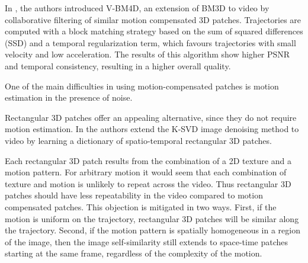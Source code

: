 \documentclass[10pt, journal, twocolumn, final, a4paper]{IEEEtran}
\begin{document}
In \cite{Maggioni2011,Maggioni2012}, the authors introduced V-BM4D, an
extension of BM3D to video by collaborative filtering of similar motion
compensated 3D patches. Trajectories are computed with a block matching
strategy based on the sum of squared differences (SSD) and a temporal
regularization term, which favours trajectories with small velocity and low
acceleration. The results of this algorithm show higher PSNR and temporal
consistency, resulting in a higher overall quality.

One of the main difficulties in using motion-compensated patches is motion
estimation in the presence of noise.

Rectangular 3D patches offer an appealing
alternative, since they do not require motion estimation.
In \cite{Protter2007,Protter2009} the authors extend the K-SVD \cite{Elad2006}
image denoising method to video by learning a dictionary of spatio-temporal
rectangular 3D patches.

Each rectangular 3D patch results from the combination of a 2D texture and a
motion pattern. For arbitrary motion it would seem that each combination of
texture and motion is unlikely to repeat across the video. Thus rectangular 3D
patches should have less repeatability in the video compared to motion
compensated patches. 
This objection is mitigated in two ways. First, if the motion is uniform on the
trajectory, rectangular 3D patches will be similar along the trajectory.
Second, if the motion pattern is spatially homogeneous in a region of the
image, then the image self-similarity still extends to space-time patches
starting at the same frame, regardless of the complexity of the motion. 

\bigskip
\end{document}
